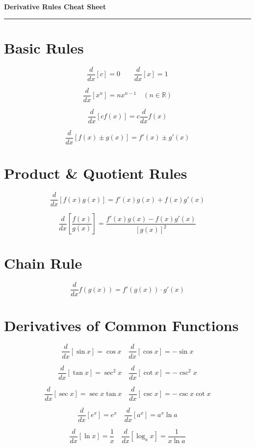 \documentclass[fleqn]{article}
\begin{document}
\begin{center}
  {\LARGE \textbf{Derivative Rules Cheat Sheet}}\\[6pt]
  \rule{\linewidth}{0.5pt}
\end{center}

\begin{multicols}{2}
\small

\section*{Basic Rules}

\[
\frac{d}{dx}[c] = 0
\quad\quad
\frac{d}{dx}[x] = 1
\]

\[
\frac{d}{dx}[x^n] = nx^{n-1} \quad (n \in \mathbb{R})
\]

\[
\frac{d}{dx}[cf(x)] = c \frac{d}{dx}f(x)
\]

\[
\frac{d}{dx}[f(x) \pm g(x)] = f'(x) \pm g'(x)
\]

\section*{Product \& Quotient Rules}

\[
\frac{d}{dx}[f(x)g(x)] = f'(x)g(x) + f(x)g'(x)
\]

\[
\frac{d}{dx}\left[\frac{f(x)}{g(x)}\right] 
= \frac{f'(x)g(x) - f(x)g'(x)}{[g(x)]^2}
\]

\section*{Chain Rule}

\[
\frac{d}{dx}f(g(x)) = f'(g(x)) \cdot g'(x)
\]

\section*{Derivatives of Common Functions}

\[
\frac{d}{dx}[\sin x] = \cos x
\quad
\frac{d}{dx}[\cos x] = -\sin x
\]

\[
\frac{d}{dx}[\tan x] = \sec^2 x
\quad
\frac{d}{dx}[\cot x] = -\csc^2 x
\]

\[
\frac{d}{dx}[\sec x] = \sec x \tan x
\quad
\frac{d}{dx}[\csc x] = -\csc x \cot x
\]

\[
\frac{d}{dx}[e^x] = e^x
\quad
\frac{d}{dx}[a^x] = a^x \ln a
\]

\[
\frac{d}{dx}[\ln x] = \frac{1}{x}
\quad
\frac{d}{dx}[\log_a x] = \frac{1}{x \ln a}
\]


\end{multicols}
\end{document}
